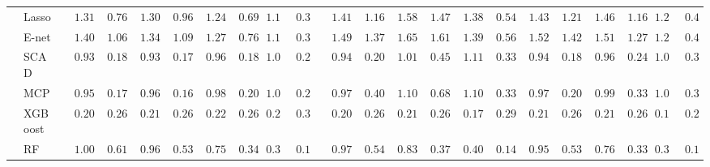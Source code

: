 \begin{tabular}{ll|ll|llllll|llllll|llllll}
 & Lasso  & $\phantom{00}1.31$ & $\phantom{00}0.76$ & $\phantom{00}1.30$ & $\phantom{00}0.96$ & $\phantom{00}1.24$ & $\phantom{00}0.69$ & $\phantom{0}1.19$ & $\phantom{0}0.33$ & $\phantom{00}1.41$ & $\phantom{00}1.16$ & $\phantom{00}1.58$ & $\phantom{00}1.47$ & $\phantom{00}1.38$ & $\phantom{00}0.54$ & $\phantom{00}1.43$ & $\phantom{00}1.21$ & $\phantom{00}1.46$ & $\phantom{00}1.16$ & $\phantom{0}1.22$ & $\phantom{0}0.40$ \\
 & E-net  & $\phantom{00}1.40$ & $\phantom{00}1.06$ & $\phantom{00}1.34$ & $\phantom{00}1.09$ & $\phantom{00}1.27$ & $\phantom{00}0.76$ & $\phantom{0}1.19$ & $\phantom{0}0.31$ & $\phantom{00}1.49$ & $\phantom{00}1.37$ & $\phantom{00}1.65$ & $\phantom{00}1.61$ & $\phantom{00}1.39$ & $\phantom{00}0.56$ & $\phantom{00}1.52$ & $\phantom{00}1.42$ & $\phantom{00}1.51$ & $\phantom{00}1.27$ & $\phantom{0}1.23$ & $\phantom{0}0.41$ \\
 & SCAD  & $\phantom{00}0.93$ & $\phantom{00}0.18$ & $\phantom{00}0.93$ & $\phantom{00}0.17$ & $\phantom{00}0.96$ & $\phantom{00}0.18$ & $\phantom{0}1.08$ & $\phantom{0}0.29$ & $\phantom{00}0.94$ & $\phantom{00}0.20$ & $\phantom{00}1.01$ & $\phantom{00}0.45$ & $\phantom{00}1.11$ & $\phantom{00}0.33$ & $\phantom{00}0.94$ & $\phantom{00}0.18$ & $\phantom{00}0.96$ & $\phantom{00}0.24$ & $\phantom{0}1.08$ & $\phantom{0}0.30$ \\
 & MCP  & $\phantom{00}0.95$ & $\phantom{00}0.17$ & $\phantom{00}0.96$ & $\phantom{00}0.16$ & $\phantom{00}0.98$ & $\phantom{00}0.20$ & $\phantom{0}1.06$ & $\phantom{0}0.27$ & $\phantom{00}0.97$ & $\phantom{00}0.40$ & $\phantom{00}1.10$ & $\phantom{00}0.68$ & $\phantom{00}1.10$ & $\phantom{00}0.33$ & $\phantom{00}0.97$ & $\phantom{00}0.20$ & $\phantom{00}0.99$ & $\phantom{00}0.33$ & $\phantom{0}1.07$ & $\phantom{0}0.31$ \\
 & XGBoost  & $\phantom{00}0.20$ & $\phantom{00}0.26$ & $\phantom{00}0.21$ & $\phantom{00}0.26$ & $\phantom{00}0.22$ & $\phantom{00}0.26$ & $\phantom{0}0.23$ & $\phantom{0}0.30$ & $\phantom{00}0.20$ & $\phantom{00}0.26$ & $\phantom{00}0.21$ & $\phantom{00}0.26$ & $\phantom{00}0.17$ & $\phantom{00}0.29$ & $\phantom{00}0.21$ & $\phantom{00}0.26$ & $\phantom{00}0.21$ & $\phantom{00}0.26$ & $\phantom{0}0.18$ & $\phantom{0}0.29$ \\
 & RF  & $\phantom{00}1.00$ & $\phantom{00}0.61$ & $\phantom{00}0.96$ & $\phantom{00}0.53$ & $\phantom{00}0.75$ & $\phantom{00}0.34$ & $\phantom{0}0.36$ & $\phantom{0}0.11$ & $\phantom{00}0.97$ & $\phantom{00}0.54$ & $\phantom{00}0.83$ & $\phantom{00}0.37$ & $\phantom{00}0.40$ & $\phantom{00}0.14$ & $\phantom{00}0.95$ & $\phantom{00}0.53$ & $\phantom{00}0.76$ & $\phantom{00}0.33$ & $\phantom{0}0.38$ & $\phantom{0}0.12$ \\

\end{tabular}
